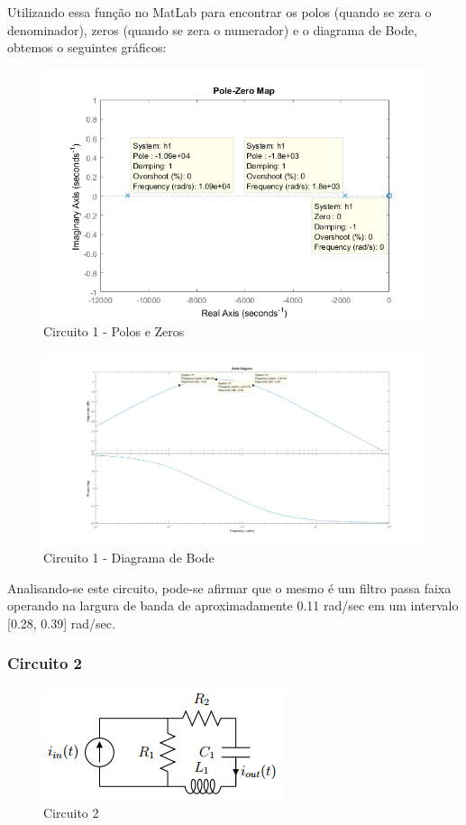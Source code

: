 \documentclass[a4paper, 12pt]{article}
\begin{document}
			Utilizando essa função no MatLab para encontrar os polos (quando se zera o denominador), zeros (quando se zera o numerador) e o diagrama de Bode, obtemos o seguintes gráficos:
			
			\begin{figure}[!ht]
				\centering
				\includegraphics[scale=0.7]{img/1e_circ1.png}
				\caption{Circuito 1 - Polos e Zeros}	
			\end{figure}	
			
			\begin{figure}[!ht]
				\centering
				\includegraphics[scale=0.9]{img/1f_circ1.png}
				\caption{Circuito 1 - Diagrama de Bode}	
			\end{figure}						
			\newpage								
			Analisando-se este circuito, pode-se afirmar que o mesmo é um filtro passa faixa operando na largura de banda de aproximadamente 0.11 rad/sec em um intervalo [0.28, 0.39] rad/sec.
			
			
			\subsubsection{Circuito 2}
			\begin{figure}[!ht]
				\centering
				\includegraphics{img/circuito2.png}
				\caption{Circuito 2}	
			\end{figure}			
			
\end{document}
